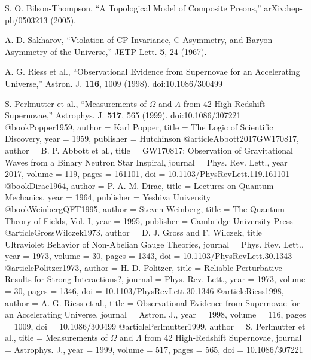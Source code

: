 \documentclass[10pt,reprint,aps,onecolumn,nofootinbib]{revtex4-2}
\begin{document}
\begin{thebibliography}{99}
    S. O. Bilson-Thompson,
    ``A Topological Model of Composite Preons,''
    arXiv:hep-ph/0503213 (2005).

    A. D. Sakharov,
    ``Violation of CP Invariance, C Asymmetry, and Baryon Asymmetry of the Universe,''
    JETP Lett. \textbf{5}, 24 (1967).

    A. G. Riess et al.,
    ``Observational Evidence from Supernovae for an Accelerating Universe,''
    Astron. J. \textbf{116}, 1009 (1998).
    doi:10.1086/300499

    S. Perlmutter et al.,
    ``Measurements of $\Omega$ and $\Lambda$ from 42 High-Redshift Supernovae,''
    Astrophys. J. \textbf{517}, 565 (1999).
    doi:10.1086/307221
    @book{Popper1959,
    author = {Karl Popper}, title = {The Logic of Scientific Discovery},
    year = {1959}, publisher = {Hutchinson}
    }
    @article{Abbott2017GW170817,
    author = {B. P. Abbott et al.},
    title = {GW170817: Observation of Gravitational Waves from a Binary Neutron Star Inspiral},
    journal = {Phys. Rev. Lett.}, year = {2017}, volume = {119}, pages = {161101},
    doi = {10.1103/PhysRevLett.119.161101}
    }
    @book{Dirac1964,
    author = {P. A. M. Dirac}, title = {Lectures on Quantum Mechanics},
    year = {1964}, publisher = {Yeshiva University}
    }
    @book{WeinbergQFT1995,
    author = {Steven Weinberg}, title = {The Quantum Theory of Fields, Vol. I},
    year = {1995}, publisher = {Cambridge University Press}
    }
    @article{GrossWilczek1973,
    author = {D. J. Gross and F. Wilczek},
    title = {Ultraviolet Behavior of Non-Abelian Gauge Theories},
    journal = {Phys. Rev. Lett.}, year = {1973}, volume = {30}, pages = {1343},
    doi = {10.1103/PhysRevLett.30.1343}
    }
    @article{Politzer1973,
    author = {H. D. Politzer},
    title = {Reliable Perturbative Results for Strong Interactions?},
    journal = {Phys. Rev. Lett.}, year = {1973}, volume = {30}, pages = {1346},
    doi = {10.1103/PhysRevLett.30.1346}
    }
    @article{Riess1998,
    author = {A. G. Riess et al.},
    title = {Observational Evidence from Supernovae for an Accelerating Universe},
    journal = {Astron. J.}, year = {1998}, volume = {116}, pages = {1009},
    doi = {10.1086/300499}
    }
    @article{Perlmutter1999,
    author = {S. Perlmutter et al.},
    title = {Measurements of $\Omega$ and $\Lambda$ from 42 High-Redshift Supernovae},
    journal = {Astrophys. J.}, year = {1999}, volume = {517}, pages = {565},
    doi = {10.1086/307221}
    }

    \end{thebibliography}
\end{document}
